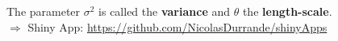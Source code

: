 \documentclass{beamer}
\newcommand\Ni[2]{{|| #1 ||}_{\! #2}}
\begin{document}
\begin{frame}{}
\vspace{2mm}
\normalsize
The parameter $\sigma^2$ is called the \textbf{variance} and $\theta$ the \textbf{length-scale}.\\
\alert{$\Rightarrow$ Shiny App:} \url{https://github.com/NicolasDurrande/shinyApps} \\
\end{frame}

\end{document}
